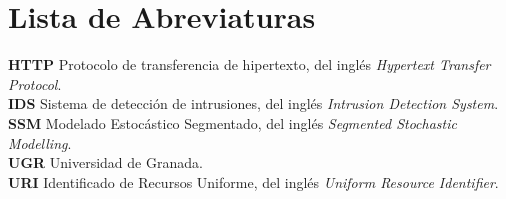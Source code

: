 \chapter*{Lista de Abreviaturas}
\label{abreviaturas}


\textbf{HTTP} Protocolo de transferencia de hipertexto, del inglés \textit{Hypertext Transfer Protocol}.\\

\textbf{IDS} Sistema de detección de intrusiones, del inglés \textit{Intrusion Detection System}.\\

\textbf{SSM} Modelado Estocástico Segmentado, del inglés \textit{Segmented Stochastic Modelling}.\\

\textbf{UGR} Universidad de Granada.\\

\textbf{URI} Identificado de Recursos Uniforme, del inglés \textit{Uniform Resource Identifier}.